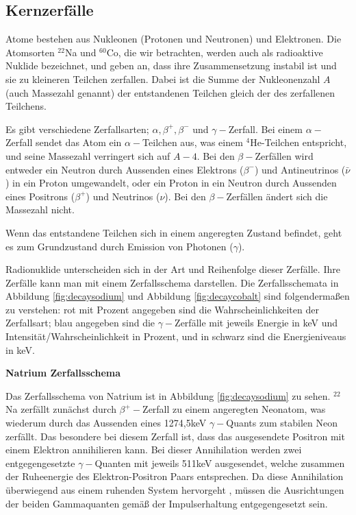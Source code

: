 \documentclass[%
aps,
onecolumn,
11pt,
tightenlines,
nofootinbib,
superscriptaddress,
floatfix,
prd,
]{revtex4-2}
\begin{document}
\subsection{Kernzerfälle}
\label{sec:Kernzerfälle}
Atome bestehen aus Nukleonen (Protonen und Neutronen) und Elektronen. Die Atomsorten $^{22}$Na und $^{60}$Co, die wir betrachten, werden auch als radioaktive Nuklide bezeichnet, und geben an, dass ihre Zusammensetzung instabil ist und sie zu kleineren Teilchen zerfallen. Dabei ist die Summe der Nukleonenzahl $A$ (auch Massezahl genannt) der entstandenen Teilchen gleich der des zerfallenen Teilchens. \par
Es gibt verschiedene Zerfallsarten; $\alpha, \beta^+, \beta^-$ und $\gamma-$Zerfall. Bei einem $\alpha-$Zerfall sendet das Atom ein $\alpha-$Teilchen aus, was einem $^4$He-Teilchen entspricht, und seine Massezahl verringert sich auf $A - 4$. Bei den $\beta-$Zerfällen wird entweder ein Neutron durch Aussenden eines Elektrons ($\beta^-$) und Antineutrinos ($\bar \nu$) in ein Proton umgewandelt, oder ein Proton in ein Neutron durch Aussenden eines Positrons ($\beta^+$) und Neutrinos ($\nu$). Bei den $\beta-$Zerfällen ändert sich die Massezahl nicht. \par
Wenn das entstandene Teilchen sich in einem angeregten Zustand befindet, geht es zum Grundzustand durch Emission von Photonen ($\gamma$). \par
Radionuklide unterscheiden sich in der Art und Reihenfolge dieser Zerfälle. Ihre Zerfälle kann man mit einem Zerfallsschema darstellen. Die Zerfallsschemata in Abbildung \ref{fig:decaysodium} und Abbildung \ref{fig:decaycobalt} sind folgendermaßen zu verstehen: rot mit Prozent angegeben sind die Wahrscheinlichkeiten der Zerfallsart; blau angegeben sind die $\gamma-$Zerfälle mit jeweils Energie in keV und Intensität/Wahrscheinlichkeit in Prozent, und in schwarz sind die Energieniveaus in keV. \vspace{15pt}\par
\textbf{Natrium Zerfallsschema} \par
Das Zerfallsschema von Natrium ist in Abbildung \ref{fig:decaysodium} zu sehen. $^{22}$Na zerfällt zunächst durch $\beta^+ -$Zerfall zu einem angeregten Neonatom, was wiederum durch das Aussenden eines 1274,5keV $\gamma-$Quants zum stabilen Neon zerfällt. Das besondere bei diesem Zerfall ist, dass das ausgesendete Positron mit einem Elektron annihilieren kann. Bei dieser Annihilation werden zwei entgegengesetzte $\gamma-$Quanten mit jeweils 511keV ausgesendet, welche zusammen der Ruheenergie des Elektron-Positron Paars entsprechen. Da diese Annihilation überwiegend aus einem ruhenden System hervorgeht \cite{manual1}, müssen die Ausrichtungen der beiden Gammaquanten gemäß der Impulserhaltung entgegengesetzt sein. \par
\end{document}
